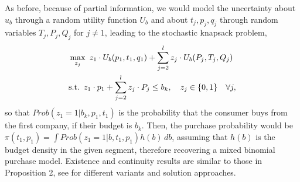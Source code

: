 \documentclass[a4paper,fleqn, 11pt]{cas-sc}
\begin{document}
As before, because of partial information, we would 
model the uncertainty about $u_b$ through a random utility function $U_b$ and about $t_j, p_j, q_j$ through random variables $T_j, P_j, Q_j$ for $j \neq1$, leading to the stochastic 
knapsack problem, 
\begin{equation}
\begin{aligned}
    & \max_{z_j} \,\, z_1 \cdot U_b(p_1, t_1, q_1) + \sum_{j=2}^l z_j \cdot U_b(P_j, T_j, Q_j) \\
    & {\rm s.t.}\,\,\,  z_1 \cdot p_1 + \sum_{j=2}^l z_j \cdot P_j \leq b_k, \quad z_j \in \{0, 1\} \quad \forall j,
\end{aligned}
\label{knapsack_eq2}
\end{equation}
so  that $Prob (z_1=1 | b_k, p_1, t_1 )$  is the probability that the consumer  
buys from the first company, if their budget is $b_k$. Then, the purchase probability would be $\pi (t_1, p_1 ) =
\int Prob (z_1=1 | b, t_1, p_1 ) h (b) \, db $, assuming that $h(b)$ is the budget density in the 
given segment, therefore recovering a mixed binomial purchase model. Existence and continuity 
results are similar to those in Proposition 2, see \cite{lyu2022stochastic,chen2014adaptive} for
different variants and solution approaches.
\end{document}
